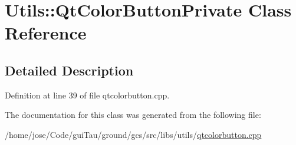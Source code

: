 \hypertarget{class_utils_1_1_qt_color_button_private}{\section{Utils\-:\-:Qt\-Color\-Button\-Private Class Reference}
\label{class_utils_1_1_qt_color_button_private}
}


\subsection{Detailed Description}


Definition at line 39 of file qtcolorbutton.\-cpp.



The documentation for this class was generated from the following file\-:\begin{DoxyCompactItemize}
\item 
/home/jose/\-Code/gui\-Tau/ground/gcs/src/libs/utils/\hyperlink{qtcolorbutton_8cpp}{qtcolorbutton.\-cpp}\end{DoxyCompactItemize}
